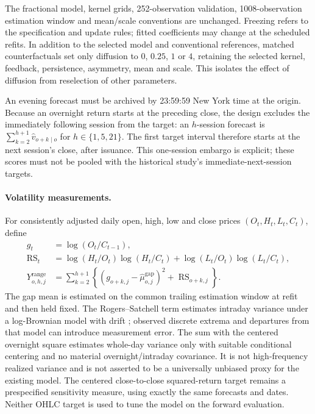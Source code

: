 \documentclass[12pt,a4paper]{article}
\begin{document}
The fractional model, kernel grids, 252-observation validation, 1008-observation
estimation window and mean/scale conventions are unchanged. Freezing refers to
the specification and update rules; fitted coefficients may change at the
scheduled refits. In addition to the selected model and conventional references,
matched counterfactuals set only diffusion to $0$, $0.25$, $1$ or $4$, retaining
the selected kernel, feedback, persistence, asymmetry, mean and scale. This
isolates the effect of diffusion from reselection of other parameters.

An evening forecast must be archived by 23:59:59 New York time at the origin.
Because an overnight return starts at the preceding close, the design excludes
the immediately following session from the target: an $h$-session forecast is
$\sum_{k=2}^{h+1}\widehat v_{o+k\mid o}$ for $h\in\{1,5,21\}$.
The first target interval therefore starts at the next session's close,
after issuance. This one-session embargo is explicit; these scores must not be
pooled with the historical study's immediate-next-session targets.

\paragraph{Volatility measurements.}
For consistently adjusted daily open, high, low and close prices
$(O_t,H_t,L_t,C_t)$, define
\begin{align}
g_t&=\log(O_t/C_{t-1}),\\
\operatorname{RS}_t&=
 \log(H_t/O_t)\log(H_t/C_t)+
 \log(L_t/O_t)\log(L_t/C_t),\\
Y^{\mathrm{range}}_{o,h,j}&=
 \sum_{k=2}^{h+1}\left\{
 (g_{o+k,j}-\widehat\mu^{\mathrm{gap}}_{o,j})^2+
 \operatorname{RS}_{o+k,j}\right\}.
\end{align}
The gap mean is estimated on the common trailing estimation window at refit
and then held fixed. The Rogers--Satchell term estimates intraday variance
under a log-Brownian model with drift \citep{rogers1991}; observed discrete
extrema and departures from that model can introduce measurement error.
The sum with the centered overnight square estimates whole-day variance only
with suitable conditional centering and no material overnight/intraday
covariance. It is not high-frequency realized variance and is not asserted
to be a universally unbiased proxy for the existing model. The centered
close-to-close squared-return target remains a prespecified sensitivity
measure, using exactly the same forecasts and dates. Neither OHLC target
is used to tune the model on the forward evaluation.
\end{document}
